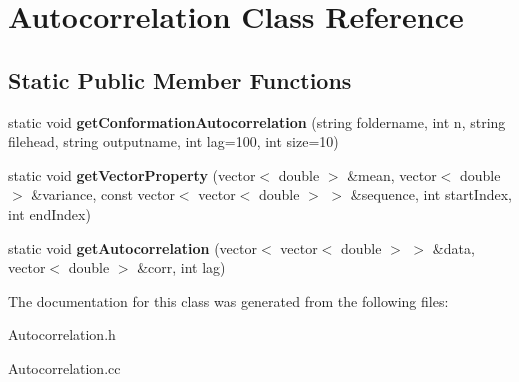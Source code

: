 \hypertarget{classAutocorrelation}{\section{Autocorrelation Class Reference}
\label{classAutocorrelation}
}
\subsection*{Static Public Member Functions}
\begin{DoxyCompactItemize}
\item 
\hypertarget{classAutocorrelation_a88c847ebb5b16897aae866f3ccf57a7c}{static void {\bfseries get\-Conformation\-Autocorrelation} (string foldername, int n, string filehead, string outputname, int lag=100, int size=10)}\label{classAutocorrelation_a88c847ebb5b16897aae866f3ccf57a7c}

\item 
\hypertarget{classAutocorrelation_a397e689a6fdfd1fd9280d9e6a87ca428}{static void {\bfseries get\-Vector\-Property} (vector$<$ double $>$ \&mean, vector$<$ double $>$ \&variance, const vector$<$ vector$<$ double $>$ $>$ \&sequence, int start\-Index, int end\-Index)}\label{classAutocorrelation_a397e689a6fdfd1fd9280d9e6a87ca428}

\item 
\hypertarget{classAutocorrelation_a4196d68d9533fea6d304ac0bc85ee4fe}{static void {\bfseries get\-Autocorrelation} (vector$<$ vector$<$ double $>$ $>$ \&data, vector$<$ double $>$ \&corr, int lag)}\label{classAutocorrelation_a4196d68d9533fea6d304ac0bc85ee4fe}

\end{DoxyCompactItemize}


The documentation for this class was generated from the following files\-:\begin{DoxyCompactItemize}
\item 
Autocorrelation.\-h\item 
Autocorrelation.\-cc\end{DoxyCompactItemize}
